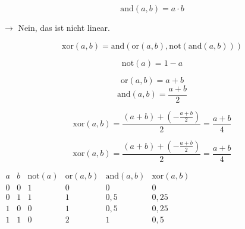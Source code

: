 \documentclass{beamer}
\begin{document}
\begin{frame}{\insertsection}{\insertsubsection}
	
	$$\mathrm{and}(a,b) = a\cdot b$$

	$\rightarrow$ Nein, das ist nicht linear.
	
\end{frame}

\begin{frame}{\insertsection}{\insertsubsection}
	
	$$\mathrm{xor}(a,b) = \mathrm{and}(\mathrm{or}(a,b), \mathrm{not}(\mathrm{and}(a,b))) $$
	
	$$\mathrm{not}(a) = 1-a$$
	
	$$\mathrm{or}(a,b) = a+b$$ 
	$$\mathrm{and}(a,b) = \frac{a+b}{2}$$
	
	$$\mathrm{xor}(a,b) = \frac{\left(a + b\right) + \left(- \frac{a+b}{2}\right)}{2} = \frac{a+b}{4}$$
	
	
\end{frame}

\begin{frame}{\insertsection}{\insertsubsection}
	
	$$\mathrm{xor}(a,b) = \frac{\left(a + b\right) + \left(- \frac{a+b}{2}\right)}{2} = \frac{a+b}{4}$$	
	
	\bigskip
	
	$\begin{array}{cccccc}
	a	& b  & \mathrm{not}(a) & \mathrm{or}(a,b) & \mathrm{and}(a,b)  & \mathrm{xor}(a,b) \\ 
	0	& 0  & 1      & 0 & 0 & 0 \\ 
	0	& 1  & 1      & 1 & 0,5 & 0,25 \\ 
	1	& 0  & 0      & 1 & 0,5 & 0,25 \\ 
	1	& 1  & 0      & 2 & 1 & 0,5
	\end{array} $
	
\end{frame}
\end{document}
